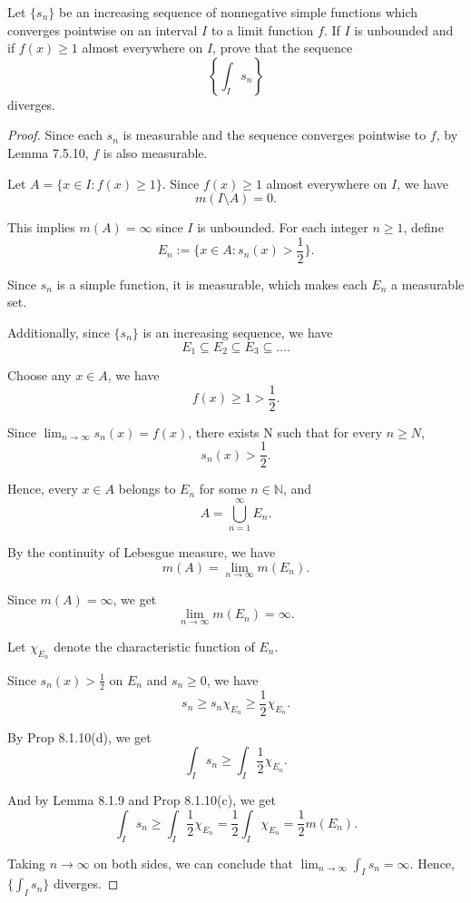 \begin{problem}
    Let \(\{s_n\}\) be an increasing sequence of nonnegative simple functions which converges pointwise on an interval \(I\) to a limit function \(f\). If \(I\) is unbounded and if \(f(x)\ge 1\) almost everywhere on \(I\), prove that the sequence
    \[
    \left\{\int_I s_n\right\}
    \] diverges.
\end{problem}

\begin{proof}
    Since each $s_n$ is measurable and the sequence converges pointwise to $f$, by Lemma 7.5.10, $f$ is also measurable. 
    
    Let $A=\{x \in I: f(x) \ge 1\}$. Since $f(x) \ge 1$ almost everywhere on $I$, we have 
    \[
    m(I \setminus A)=0.
    \]
    
    This implies $m(A)=\infty$ since $I$ is unbounded. For each integer $n \ge 1$, define
    \[
    E_n := \{x \in A: s_n(x) > \frac{1}{2}\}.
    \]
    
    Since $s_n$ is a simple function, it is measurable, which makes each $E_n$ a measurable set.
    
    Additionally, since $\{s_n\}$ is an increasing sequence, we have
    \[
    E_1 \subseteq E_2 \subseteq E_3 \subseteq \dots .
    \]
    
    Choose any $x \in A$, we have 
    \[
    f(x) \ge 1 > \frac{1}{2}.
    \]
    
    Since $\lim_{n \to \infty} s_n(x) = f(x)$, there exists N such that for every $n \ge N$,
    \[
    s_n(x) > \frac{1}{2}.
    \]

    Hence, every $x \in A$ belongs to $E_n$ for some $n \in \mathbb{N}$, and 
    \[
    A = \bigcup_{n=1}^{\infty} E_n.
    \]

    By the continuity of Lebesgue measure, we have 
    \[
    m(A) = \lim_{n \to \infty} m(E_n).
    \]
    
    Since $m(A)= \infty$, we get 
    \[
    \lim_{n \to \infty} m(E_n) = \infty.
    \]

    Let $\chi_{E_n}$ denote the characteristic function of $E_n$.
    
    Since $s_n(x)>\frac{1}{2}$ on $E_n$ and $s_n \ge 0$, we have
    \[
    s_n \ge s_n \chi_{E_n} \ge \frac{1}{2} \chi_{E_n}.
    \]
    
    By Prop 8.1.10(d), we get
    \[
    \int_I s_n \ge \int_I \frac{1}{2} \chi_{E_n}.
    \]
    
    And by Lemma 8.1.9 and Prop 8.1.10(c), we get
    \[
    \int_I s_n \ge \int_I \frac{1}{2} \chi_{E_n} = \frac{1}{2} \int_I \chi_{E_n} = \frac{1}{2} m(E_n).
    \]
    
    Taking $n \to \infty$ on both sides, we can conclude that $\lim_{n \to \infty} \int_I s_n = \infty$. Hence, $\{\int_I s_n\}$ diverges.    
\end{proof}

